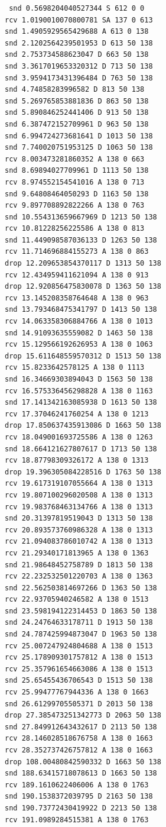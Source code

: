 \documentclass[11pt]{article}
\begin{document}
\begin{verbatim}
 snd 0.5698204040527344 S 612 0 0
rcv 1.0190010070800781 SA 137 0 613
snd 1.4905929565429688 A 613 0 138
snd 2.1202564239501953 D 613 50 138
snd 2.753734588623047 D 663 50 138
snd 3.3617019653320312 D 713 50 138
snd 3.9594173431396484 D 763 50 138
snd 4.74858283996582 D 813 50 138
snd 5.269765853881836 D 863 50 138
snd 5.890846252441406 D 913 50 138
snd 6.387472152709961 D 963 50 138
snd 6.994724273681641 D 1013 50 138
snd 7.740020751953125 D 1063 50 138
rcv 8.003473281860352 A 138 0 663
snd 8.69894027709961 D 1113 50 138
rcv 8.974552154541016 A 138 0 713
snd 9.64808464050293 D 1163 50 138
rcv 9.897708892822266 A 138 0 763
snd 10.554313659667969 D 1213 50 138
rcv 10.81228256225586 A 138 0 813
snd 11.449098587036133 D 1263 50 138
rcv 11.714696884155273 A 138 0 863
drop 12.209653854370117 D 1313 50 138
rcv 12.434959411621094 A 138 0 913
drop 12.920856475830078 D 1363 50 138
rcv 13.145208358764648 A 138 0 963
snd 13.793468475341797 D 1413 50 138
rcv 14.063358306884766 A 138 0 1013
snd 14.91093635559082 D 1463 50 138
rcv 15.129566192626953 A 138 0 1063
drop 15.611648559570312 D 1513 50 138
rcv 15.8233642578125 A 138 0 1113
snd 16.34669303894043 D 1563 50 138
rcv 16.575336456298828 A 138 0 1163
snd 17.141342163085938 D 1613 50 138
rcv 17.37046241760254 A 138 0 1213
drop 17.850637435913086 D 1663 50 138
rcv 18.049001693725586 A 138 0 1263
snd 18.664121627807617 D 1713 50 138
rcv 18.87798309326172 A 138 0 1313
drop 19.396305084228516 D 1763 50 138
rcv 19.617319107055664 A 138 0 1313
rcv 19.807100296020508 A 138 0 1313
rcv 19.983768463134766 A 138 0 1313
snd 20.31397819519043 D 1313 50 138
rcv 20.893573760986328 A 138 0 1313
rcv 21.094083786010742 A 138 0 1313
rcv 21.29340171813965 A 138 0 1363
snd 21.98648452758789 D 1813 50 138
rcv 22.232532501220703 A 138 0 1363
snd 22.562503814697266 D 1363 50 138
rcv 22.93705940246582 A 138 0 1513
snd 23.598194122314453 D 1863 50 138
snd 24.24764633178711 D 1913 50 138
snd 24.787425994873047 D 1963 50 138
rcv 25.007247924804688 A 138 0 1513
rcv 25.178909301757812 A 138 0 1513
rcv 25.357961654663086 A 138 0 1513
snd 25.65455436706543 D 1513 50 138
rcv 25.99477767944336 A 138 0 1663
snd 26.61299705505371 D 2013 50 138
drop 27.385473251342773 D 2063 50 138
snd 27.849912643432617 D 2113 50 138
rcv 28.146028518676758 A 138 0 1663
rcv 28.352737426757812 A 138 0 1663
drop 108.00480842590332 D 1663 50 138
snd 188.63415718078613 D 1663 50 138
rcv 189.1610622406006 A 138 0 1763
snd 190.1538372039795 D 2163 50 138
snd 190.73772430419922 D 2213 50 138
rcv 191.0989284515381 A 138 0 1763

\end{verbatim}
\end{document}
